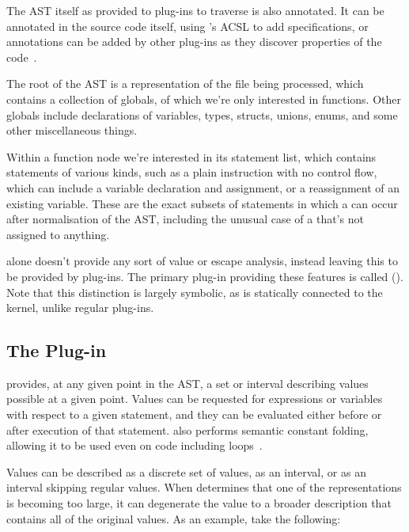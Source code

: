 The AST itself as provided to plug-ins to traverse is also annotated. It can be annotated in the source code itself, using 's ACSL to add specifications, or annotations can be added by other plug-ins as they discover properties of the code~\cite{framaplug}.

The root of the AST is a representation of the file being processed, which contains a collection of globals, of which we're only interested in functions. Other globals include declarations of variables, types, structs, unions, enums, and some other miscellaneous things.

Within a function node we're interested in its statement list, which contains statements of various kinds, such as a plain instruction with no control flow, which can include a variable declaration and assignment, or a reassignment of an existing variable. These are the exact subsets of statements in which a \malloc{} can occur after normalisation of the AST, including the unusual case of a \malloc{} that's not assigned to anything.

 alone doesn't provide any sort of value or escape analysis, instead leaving this to be provided by plug-ins. The primary plug-in providing these features is called  (). Note that this distinction is largely symbolic, as  is statically connected to the  kernel, unlike regular plug-ins.

\subsection{The  Plug-in}

 provides, at any given point in the AST, a set or interval describing values possible at a given point. Values can be requested for expressions or variables with respect to a given statement, and they can be evaluated either before or after execution of that statement.  also performs semantic constant folding, allowing it to be used even on code including loops~\cite{framaeva}.

Values can be described as a discrete set of values, as an interval, or as an interval skipping regular values. When  determines that one of the representations is becoming too large, it can degenerate the value to a broader description that contains all of the original values. As an example, take the following:

